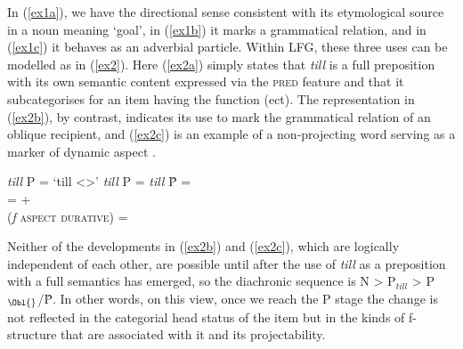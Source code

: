 \documentclass[output=paper]{langsci/langscibook}
\begin{document}
In (\ref{ex1a}), we have the directional sense consistent with its etymological
source in a noun meaning `goal', in (\ref{ex1b}) it marks a grammatical
relation, and in (\ref{ex1c}) it behaves as an adverbial particle. Within
\gls{LFG}, these three uses can be modelled as in (\ref{ex2}). Here
(\ref{ex2a}) simply states that  \emph{till} is a full preposition with its own
semantic content expressed via the \textsc{pred} feature and that it
subcategorises for an item having the function \Obj{}(ect). The representation
in (\ref{ex2b}), by contrast, indicates its use to mark the grammatical relation
of an oblique recipient, and  (\ref{ex2c}) is an example of a non-projecting
word serving as a marker of dynamic aspect \citep[142]{Toivonen03}.

\begin{exe}
\ex\label{ex2}
\begin{xlist}
\ex\label{ex2a}
\emph{till}\hspace{0.3cm} P\hspace{0.3cm}  = `till <\Obj{}>'
\ex\label{ex2b}
\emph{till}\hspace{0.3cm} P\hspace{0.3cm}  =
\Obl{}
\ex\label{ex2c}
\emph{till}\hspace{0.3cm} \^P\hspace{0.3cm}  = \textminus\\
 = +\\
 (\emph{f} \textsc{aspect durative}) = \textminus
\end{xlist}
\end{exe}

Neither of the developments in (\ref{ex2b}) and (\ref{ex2c}), which are
logically independent of each other, are possible until after the use of
\emph{till} as a preposition with a full semantics has emerged, so the
diachronic sequence is N > P$_{till}$ > P$_{\Obl{}}$/\^P. In other words,
on this view, once we reach the P stage the change is not reflected in the
categorial head status of the item but in the kinds of f-structure that are
associated with it and its projectability.
\end{document}
